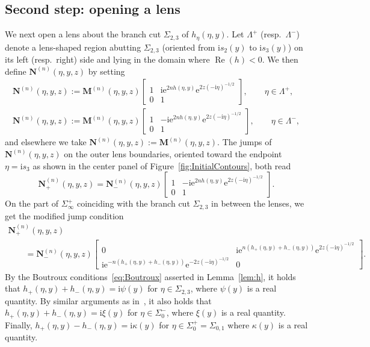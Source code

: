 \documentclass[11pt]{article}
\numberwithin{equation}{section}
\numberwithin{equation}{section}
\begin{document}
\subsection{Second step: opening a lens}
We next open a lens about the branch cut $\Sigma_{2,3}$ of $h_\eta(\eta,y)$. Let $\Lambda^+$ (resp.\ $\Lambda^-$) denote a lens-shaped region abutting $\Sigma_{2,3}$ (oriented from $\mathrm{i} s_2(y)$ to $\mathrm{i} s_3(y)$) on its left (resp.\ right) side and lying in the domain where $\operatorname{Re}(h)<0$. We then define $\mathbf{N}^{(n)}(\eta,y,z)$ by setting
\begin{gather*}
\mathbf{N}^{(n)}(\eta,y,z):=\mathbf{M}^{(n)}(\eta,y,z)\begin{bmatrix}1&\mathrm{i}\mathrm{e}^{2nh(\eta,y)}\mathrm{e}^{2z(-\mathrm{i}\eta)^{-1/2}}\\0&1\end{bmatrix},\qquad \eta\in\Lambda^+,
\\
\mathbf{N}^{(n)}(\eta,y,z):=\mathbf{M}^{(n)}(\eta,y,z)\begin{bmatrix}1&-\mathrm{i}\mathrm{e}^{2nh(\eta,y)}\mathrm{e}^{2z(-\mathrm{i}\eta)^{-1/2}}\\0&1\end{bmatrix},\qquad\eta\in\Lambda^-,
\end{gather*}
and elsewhere we take $\mathbf{N}^{(n)}(\eta,y,z):=\mathbf{M}^{(n)}(\eta,y,z)$. The jumps of $\mathbf{N}^{(n)}(\eta,y,z)$ on the outer lens boundaries, oriented toward the endpoint $\eta=\mathrm{i} s_3$ as shown in the center panel of Figure~\ref{fig:InitialContours}, both read
\begin{equation*}
\mathbf{N}^{(n)}_+(\eta,y,z)=\mathbf{N}^{(n)}_-(\eta,y,z)\begin{bmatrix}1&-\mathrm{i}\mathrm{e}^{2nh(\eta,y)}\mathrm{e}^{2z(-\mathrm{i}\eta)^{-1/2}}\\0&1\end{bmatrix}.
\end{equation*}
On the part of $\Sigma_\infty^+$ coinciding with the branch cut $\Sigma_{2,3}$ in between the lenses, we get the modified jump condition
\begin{gather*}
\mathbf{N}^{(n)}_+(\eta,y,z) \\
\qquad
=\mathbf{N}^{(n)}_-(\eta,y,z)\begin{bmatrix}0 & \mathrm{i}\mathrm{e}^{n(h_+(\eta,y)+h_-(\eta,y))}\mathrm{e}^{2z(-\mathrm{i}\eta)^{-1/2}}\\\mathrm{i}\mathrm{e}^{-n(h_+(\eta,y)+h_-(\eta,y))}\mathrm{e}^{-2z(-\mathrm{i}\eta)^{-1/2}} & 0\end{bmatrix}.
\end{gather*}
By the Boutroux conditions~\eqref{eq:Boutroux} asserted in Lemma~\ref{lem:h}, it holds that $h_+(\eta,y)+h_-(\eta,y)=\mathrm{i}\psi(y)$ for $\eta\in\Sigma_{2,3}$, where $\psi(y)$ is a real quantity. By similar arguments as in~\cite{BuckinghamM22}, it also holds that $h_+(\eta,y)+h_-(\eta,y)=\mathrm{i}\xi(y)$ for $\eta\in\Sigma_0^-$, where $\xi(y)$ is a real quantity. Finally, $h_+(\eta,y)-h_-(\eta,y)=\mathrm{i}\kappa(y)$ for $\eta\in\Sigma_0^+=\Sigma_{0,1}$ where $\kappa(y)$ is a real quantity.
\end{document}
